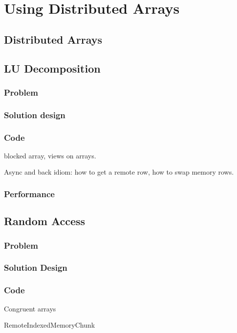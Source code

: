 \chapter{Using Distributed Arrays}
\section{Distributed Arrays}
\section{LU Decomposition}    \label{sec:LU}
\subsection{Problem}
\subsection{Solution design} 
\subsection{Code} 
      blocked array, views on arrays.

      Async and back idiom: how to get a remote row, how to swap memory rows.
\subsection{Performance}


\section{Random Access}\label{sec:random-access}
\subsection{Problem}
\subsection{Solution Design} 
\subsection{Code} 
       Congruent arrays

       RemoteIndexedMemoryChunk

